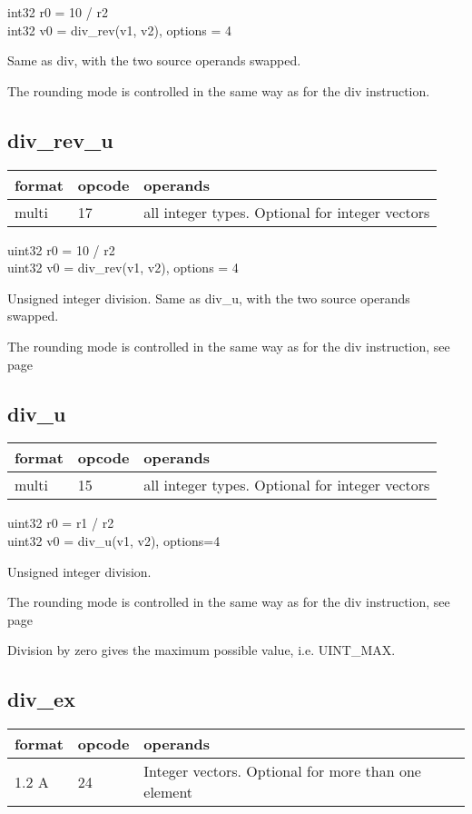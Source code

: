 \documentclass[forwardcom.tex]{subfiles}
\begin{document}
int32 r0 = 10 / r2 \\
int32 v0 = div\_rev(v1, v2), options = 4
\vv

Same as div, with the two source operands swapped.

The rounding mode is controlled in the same way as for the div instruction.
\vv

\subsection{div\_rev\_u}
\label{table:divRevUInstruction}
\begin{tabular}{|p{12mm}|p{15mm}|p{100mm}|}
\hline
\bfseries format & \bfseries opcode & \bfseries operands \\ \hline
multi & 17 & all integer types. Optional for integer vectors \\ \hline
\end{tabular}
\vv

uint32 r0 = 10 / r2 \\
uint32 v0 = div\_rev(v1, v2), options = 4
\vv

Unsigned integer division. Same as div\_u, with the two source operands swapped.

The rounding mode is controlled in the same way as for the div instruction, see page \pageref{table:DivInstructions}
\vv

\subsection{div\_u}
\label{table:divUInstruction}
\begin{tabular}{|p{12mm}|p{15mm}|p{100mm}|}
\hline
\bfseries format & \bfseries opcode & \bfseries operands \\ \hline
multi & 15 & all integer types. Optional for integer vectors \\ \hline
\end{tabular}
\vv

uint32 r0 = r1 / r2 \\
uint32 v0 = div\_u(v1, v2), options=4
\vv

Unsigned integer division.

The rounding mode is controlled in the same way as for the div instruction, see page \pageref{table:DivInstructions}

\vv
Division by zero gives the maximum possible value, i.e. UINT\_MAX.
\vv


\subsection{div\_ex}
\label{table:divExInstruction}
\begin{tabular}{|p{12mm}|p{15mm}|p{100mm}|}
\hline
\bfseries format & \bfseries opcode & \bfseries operands \\ \hline
1.2 A & 24 & Integer vectors. Optional for more than one element \\ \hline
\end{tabular}
\vv
\end{document}
